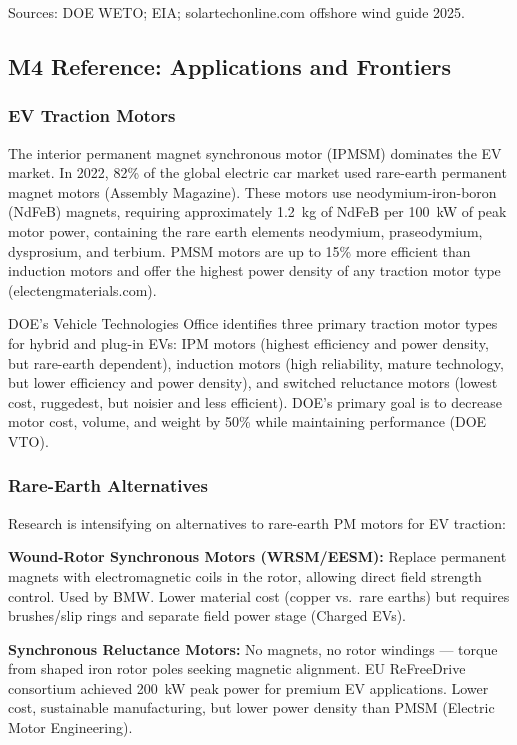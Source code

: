 \documentclass[11pt,letterpaper]{article}
\begin{document}
{\small Sources: DOE WETO; EIA; solartechonline.com offshore wind guide 2025.}

\subsection{M4 Reference: Applications and Frontiers}

\subsubsection{EV Traction Motors}

The interior permanent magnet synchronous motor (IPMSM) dominates the EV market. In 2022, 82\% of the global electric car market used rare-earth permanent magnet motors (Assembly Magazine). These motors use neodymium-iron-boron (NdFeB) magnets, requiring approximately 1.2~kg of NdFeB per 100~kW of peak motor power, containing the rare earth elements neodymium, praseodymium, dysprosium, and terbium. PMSM motors are up to 15\% more efficient than induction motors and offer the highest power density of any traction motor type (electengmaterials.com).

DOE's Vehicle Technologies Office identifies three primary traction motor types for hybrid and plug-in EVs: IPM motors (highest efficiency and power density, but rare-earth dependent), induction motors (high reliability, mature technology, but lower efficiency and power density), and switched reluctance motors (lowest cost, ruggedest, but noisier and less efficient). DOE's primary goal is to decrease motor cost, volume, and weight by 50\% while maintaining performance (DOE VTO).

\subsubsection{Rare-Earth Alternatives}

Research is intensifying on alternatives to rare-earth PM motors for EV traction:

\textbf{Wound-Rotor Synchronous Motors (WRSM/EESM):} Replace permanent magnets with electromagnetic coils in the rotor, allowing direct field strength control. Used by BMW. Lower material cost (copper vs.\ rare earths) but requires brushes/slip rings and separate field power stage (Charged EVs).

\textbf{Synchronous Reluctance Motors:} No magnets, no rotor windings --- torque from shaped iron rotor poles seeking magnetic alignment. EU ReFreeDrive consortium achieved 200~kW peak power for premium EV applications. Lower cost, sustainable manufacturing, but lower power density than PMSM (Electric Motor Engineering).
\end{document}
